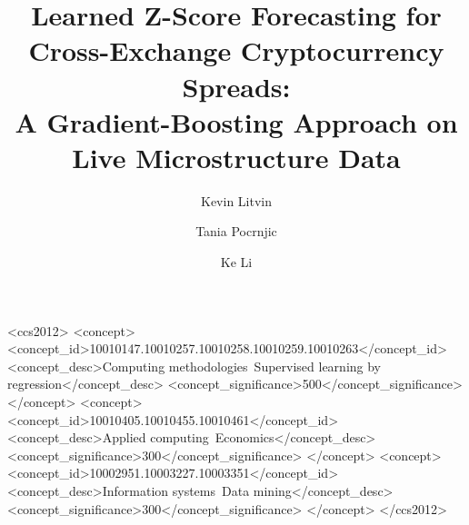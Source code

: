 \documentclass[sigconf,anonymous,review]{acmart}
\begin{document}
\title{Learned Z-Score Forecasting for Cross-Exchange Cryptocurrency
Spreads:\\A Gradient-Boosting Approach on Live Microstructure Data}

\author{Kevin Litvin}

\author{Tania Pocrnjic}

\author{Ke Li}



\begin{CCSXML}
<ccs2012>
  <concept>
    <concept_id>10010147.10010257.10010258.10010259.10010263</concept_id>
    <concept_desc>Computing methodologies~Supervised learning by regression</concept_desc>
    <concept_significance>500</concept_significance>
  </concept>
  <concept>
    <concept_id>10010405.10010455.10010461</concept_id>
    <concept_desc>Applied computing~Economics</concept_desc>
    <concept_significance>300</concept_significance>
  </concept>
  <concept>
    <concept_id>10002951.10003227.10003351</concept_id>
    <concept_desc>Information systems~Data mining</concept_desc>
    <concept_significance>300</concept_significance>
  </concept>
</ccs2012>
\end{CCSXML}



\maketitle









\end{document}
